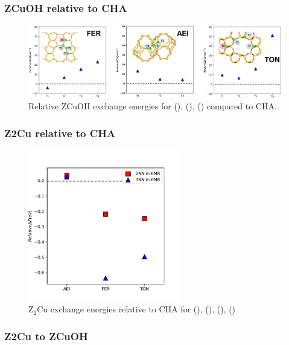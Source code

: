 \documentclass[12pt]{article}
\begin{document}
\subsubsection*{ZCuOH relative to CHA}
\begin{figure}[H]
\centering
  \includegraphics[width=5.2in]{./Figures/Figure-3}
  \caption{Relative ZCuOH exchange energies  for (), (), () compared to CHA.}
  \label{ZH}
\end{figure}

\subsubsection*{Z2Cu relative to CHA}
\begin{figure}[H]
\centering
  \includegraphics[width=2.6in]{./Figures/Figure-4}
  \caption{Z$_{2}$Cu exchange energies relative to CHA for (), (), (), ()}
  \label{PhaseDiagram}
\end{figure}

\subsubsection*{Z2Cu to ZCuOH}
\end{document}
